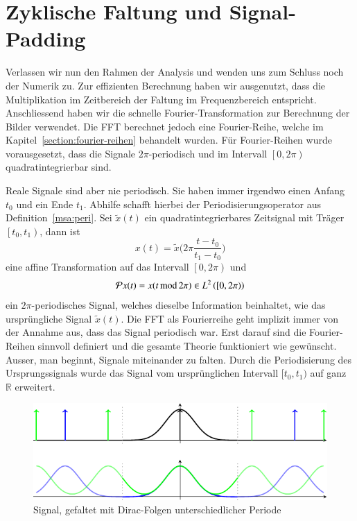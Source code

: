 \section{Zyklische Faltung und Signal-Padding}
\label{complex:circ-conv-padding}
Verlassen wir nun den Rahmen der Analysis und wenden uns zum Schluss noch der Numerik zu.
Zur effizienten Berechnung haben wir ausgenutzt, dass die Multiplikation im Zeitbereich der Faltung im Frequenzbereich entspricht.
Anschliessend haben wir die schnelle Fourier-Transformation zur Berechnung der Bilder verwendet.
Die FFT berechnet jedoch eine Fourier-Reihe, welche im Kapitel~\ref{section:fourier-reihen} behandelt wurden.
Für Fourier-Reihen wurde vorausgesetzt, dass die Signale $2\pi$-periodisch und im Intervall $\left[0, 2\pi\right)$ quadratintegrierbar sind.

Reale Signale sind aber nie periodisch.
Sie haben immer irgendwo einen Anfang $t_0$ und ein Ende $t_1$.
Abhilfe schafft hierbei der Periodisierungsoperator aus Definition~\ref{msa:peri}.
Sei $\tilde{x}(t)$ ein quadratintegrierbares Zeitsignal mit Träger $\left[t_0, t_1\right)$, dann ist
\[
	x(t) = \tilde{x}\biggl(2\pi\frac{t-t_0}{t_1-t_0}\biggr)
\]
eine affine Transformation auf das Intervall $\left[0, 2\pi \right)$ und
\[
	\Peri x(t) = x( t \,\text{mod}\, 2\pi) \in L^2\left(\left[0, 2\pi \right)\right)
\]
ein $2\pi$-periodisches Signal, welches dieselbe Information beinhaltet, wie das ursprüngliche Signal $\tilde{x}(t)$.
Die FFT als Fourierreihe geht implizit immer von der Annahme aus, dass das Signal periodisch war.
Erst darauf sind die Fourier-Reihen sinnvoll definiert und die gesamte Theorie funktioniert wie gewünscht.
Ausser, man beginnt, Signale miteinander zu falten.
Durch die Periodisierung des Ursprungssignals wurde das Signal vom ursprünglichen Intervall $[t_0, t_1)$ auf ganz $\mathbb{R}$ erweitert.

\begin{figure}
	\centering
	\includegraphics{papers/complex/images/cyclic_conv.pdf}
	\caption{Signal, gefaltet mit Dirac-Folgen unterschiedlicher Periode}
	\label{complex:cyclic-conv}
\end{figure}

